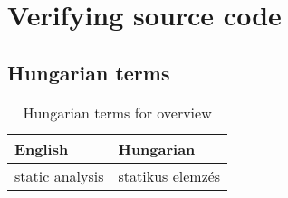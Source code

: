 \chapter{Verifying source code}


\section{Hungarian terms}

\begin{table}
    \centering
    \small
    \caption{Hungarian terms for overview}
    \begin{tabular}{ll}
        \toprule
        \textbf{English} & \textbf{Hungarian} \\
        \midrule
        static analysis & statikus elemzés \\
        \bottomrule
        \end{tabular}
        \label{tab:overview:hungarian-terms-code}
        \end{table}